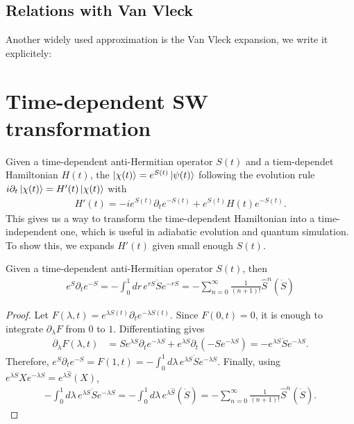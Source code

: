 \subsection{Relations with Van Vleck}

Another widely used approximation is the Van Vleck expansion, we write it explicitely:

\section{Time-dependent SW transformation}

Given a time-dependent anti-Hermitian operator $S(t)$ and a tiem-dependet Hamiltonian $H(t)$, the $\ket{\chi(t)} = e^{S(t)} \ket{\psi(t)}$ following the evolution rule $i\partial_t \ket{\chi(t)} = H'(t)\ket{\chi(t)}$ with 
\begin{align}
    H'(t) = -ie^{S(t)}\partial_t e^{-S(t)} + e^{S(t)}H(t)e^{-S(t)}. 
\end{align} 
This gives us a way to transform the time-dependent Hamiltonian into a time-independent one, which is useful in adiabatic evolution and quantum simulation.
To show this, we expands $H'(t)$ given small enough $S(t)$.
\begin{lemma}\label{lem:exp_deri}
    Given a time-dependent anti-Hermitian operator $S(t)$, then
\begin{align}
  e^S\partial_t e^{-S}
    =-\int_0^1 dr\, e^{rS}\dot S e^{-rS}
    =-\sum_{n=0}^{\infty}\frac{1}{(n+1)!}\hat{S}^n(\dot S)
\end{align}
\end{lemma}
\begin{proof}
Let $F(\lambda,t)=e^{\lambda S(t)}\partial_t e^{-\lambda S(t)}$.
Since $F(0,t)=0$, it is enough to integrate $\partial_\lambda F$ from $0$ to $1$.
Differentiating gives
\begin{align}
    \partial_\lambda F(\lambda,t)
    &=S e^{\lambda S}\partial_t e^{-\lambda S}
    +e^{\lambda S}\partial_t(-S e^{-\lambda S}) =-e^{\lambda S}\dot S e^{-\lambda S}.
\end{align}
Therefore,
$e^S\partial_t e^{-S}=F(1,t)=-\int_0^1 d\lambda\, e^{\lambda S}\dot S e^{-\lambda S}$.
Finally, using $e^{\lambda S}Xe^{-\lambda S}=e^{\lambda\hat S}(X)$,
\begin{align}
    -\int_0^1 d\lambda\, e^{\lambda S}\dot S e^{-\lambda S}
    =-\int_0^1 d\lambda\, e^{\lambda\hat S}(\dot S)
    =-\sum_{n=0}^{\infty}\frac{1}{(n+1)!}\hat S^n(\dot S).
\end{align}
\end{proof}

